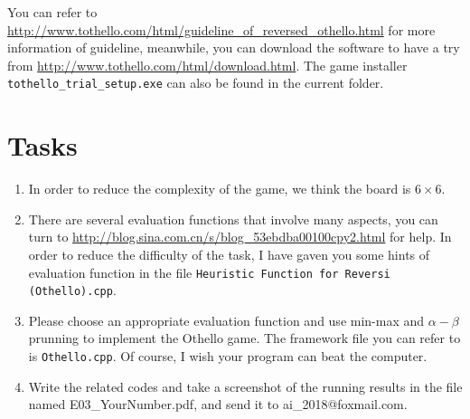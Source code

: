 ﻿\documentclass[a4paper, 11pt]{article}
\begin{document}
You can refer to \url{http://www.tothello.com/html/guideline_of_reversed_othello.html} for more information of guideline, meanwhile, you can download the software to have a try from \url{http://www.tothello.com/html/download.html}. The game installer \texttt{tothello\_trial\_setup.exe} can also be found in the current folder.



\section{Tasks}
\begin{enumerate}

\item In order to reduce the complexity of the game, we think the board is $6\times 6$.

\item There are several evaluation functions that involve many aspects, you can turn to \url{http://blog.sina.com.cn/s/blog_53ebdba00100cpy2.html} for help. In order to reduce the difficulty of the task, I have gaven you some hints of evaluation function in the file \texttt{Heuristic Function for Reversi (Othello).cpp}.

\item Please choose an appropriate evaluation function and use min-max and $\alpha-\beta$ prunning to implement the Othello game. The framework file you can refer to is \texttt{Othello.cpp}. Of course, I wish your program can beat the computer.

\item Write the related codes and take a screenshot of the running results in the file named \textsf{E03\_YourNumber.pdf}, and send it to \textsf{ai\_2018@foxmail.com}.
\end{enumerate}
\end{document}
